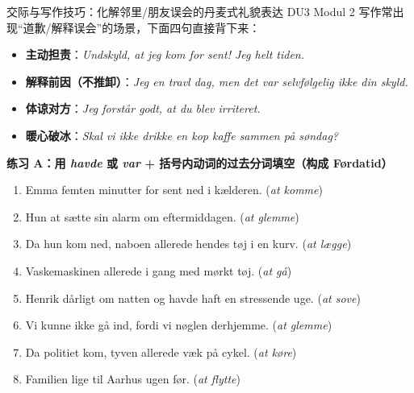 \begin{grammatikbox}{交际与写作技巧：化解邻里/朋友误会的丹麦式礼貌表达}
DU3 Modul 2 写作常出现“道歉/解释误会”的场景，下面四句直接背下来：
\begin{itemize}
  \item \textbf{主动担责}：\textit{Undskyld, at jeg kom for sent! Jeg  helt  tiden.}
  \item \textbf{解释前因（不推卸）}：\textit{Jeg  en travl dag, men det var selvfølgelig ikke din skyld.}
  \item \textbf{体谅对方}：\textit{Jeg forstår godt, at du blev irriteret.}
  \item \textbf{暖心破冰}：\textit{Skal vi ikke drikke en kop kaffe sammen på søndag?}
\end{itemize}
\end{grammatikbox}


\textbf{练习 A：用 \textit{havde} 或 \textit{var} + 括号内动词的过去分词填空（构成 Førdatid）}
\begin{enumerate}
  \item Emma \underline{\hspace{1.4cm}} \underline{\hspace{2.2cm}} femten minutter for sent ned i kælderen. (\textit{at komme})
  \item Hun \underline{\hspace{1.4cm}} \underline{\hspace{2.2cm}} at sætte sin alarm om eftermiddagen. (\textit{at glemme})
  \item Da hun kom ned, \underline{\hspace{1.4cm}} naboen allerede \underline{\hspace{2.2cm}} hendes tøj i en kurv. (\textit{at lægge})
  \item Vaskemaskinen \underline{\hspace{1.4cm}} allerede \underline{\hspace{2.2cm}} i gang med mørkt tøj. (\textit{at gå})
  \item Henrik \underline{\hspace{1.4cm}} \underline{\hspace{2.2cm}} dårligt om natten og havde haft en stressende uge. (\textit{at sove})
  \item Vi kunne ikke gå ind, fordi vi \underline{\hspace{1.4cm}} \underline{\hspace{2.2cm}} nøglen derhjemme. (\textit{at glemme})
  \item Da politiet kom, \underline{\hspace{1.4cm}} tyven allerede \underline{\hspace{2.2cm}} væk på cykel. (\textit{at køre})
  \item Familien \underline{\hspace{1.4cm}} lige \underline{\hspace{2.2cm}} til Aarhus ugen før. (\textit{at flytte})
\end{enumerate}

